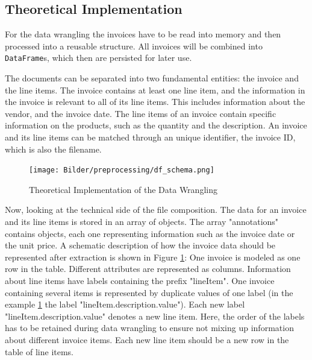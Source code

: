     \subsection{Theoretical Implementation}
    For the data wrangling the invoices have to be read into memory and then processed into a reusable structure. All invoices will be combined into \lstinline|DataFrame|s, which then are persisted for later use.
	
	The documents can be separated into two fundamental entities: the invoice and the line items. 
	The invoice contains at least one line item, and the information in the invoice is relevant to all of its line items. This includes information about the vendor, and the invoice date. The line items of an invoice contain specific information on the products, such as the quantity and the description.
	An invoice and its line items can be matched through an unique identifier, the invoice ID, which is also the filename.
	\newpage

	 \begin{figure}[ht]
		\centering
		\texttt{[image: Bilder/preprocessing/df\_schema.png]}
		\caption{Theoretical Implementation of the Data Wrangling}
		\label{fig:invoice_df_schema}
	\end{figure}	

	Now, looking at the technical side of the file composition.	The data for an invoice and its line items is stored in an array of objects. The array "annotations" contains objects, each one representing information such as the invoice date or the unit price. A schematic description of how the invoice data should be represented after extraction is shown in Figure \ref{fig:invoice_df_schema}: One invoice is modeled as one row in the table. Different attributes are represented as columns.
	Information about line items have labels containing the prefix "lineItem". One invoice containing several items is represented by duplicate values of one label (in the example \ref{fig:invoice_df_schema} the label "lineItem.description.value"). Each new label "lineItem.description.value" denotes a new line item. Here, the order of the labels has to be retained during data wrangling to ensure not mixing up information about different invoice items. Each new line item should be a new row in the table of line items.
	
